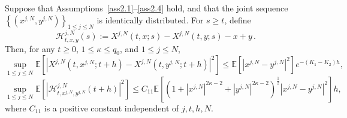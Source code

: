 \documentclass[10pt,a4paper]{amsart}
\begin{document}
\begin{lemma}\label{lemma 4.1}
    Suppose that Assumptions~\ref{ass2.1}--\ref{ass2.4} hold, and that the joint sequence $\left\{ \left( x^{j,N},y^{j,N} \right) \right\} _{1\leq j\leq N}$ is identically distributed. For $s\ge t$, define 
\begin{equation}\tag{5.24}\label{4.5}
\mathcal{H} _{t,x,y}^{j,N}\left(s\right):=X^{j,N}\left(t,x;s \right)-X^{j,N}\left(t,y;s\right)-x+y\,. 
\end{equation}
Then, for any $t \geq 0$, $1 \leq\kappa\leq q_0$, and $1 \leq j \leq N$,
\begin{equation}\tag{5.25}\label{4.6}
 \underset{1\leqslant j\leqslant N}{\sup}\mathbb{E}\left[\left|X^{j,N}\left(t, x^{j,N} ; t+h\right)-X^{j,N}\left(t, y^{j,N} ; t+h\right)\right|^{2}\right] \leq\mathbb{E}\left[\left|x^{j,N}-y^{j,N}\right|^{2}\right] e^{-\left(K_1-K_2\right) h}, 
 \end{equation}
 \begin{equation}\tag{5.26}\label{4.7}
\underset{1\leqslant j\leqslant N}{\sup}\mathbb{E}\left[\left|\mathcal{H}^{j,N}_{t, x^{j,N}, y^{j,N}}\left(t+h\right)\right|^{2}\right] \leq C_{11}\mathbb{E}\left[\left(1+\left|x^{j,N}\right|^{2 \kappa-2}+\left|y^{j,N}\right|^{2 \kappa-2}\right)^{\frac{1}{2}}\left|x^{j,N}-y^{j,N}\right|^{2}\right] h,
\end{equation}
where $C_{11} $ is a positive constant independent of $j,t, h, N $.
\end{lemma}
\end{document}
